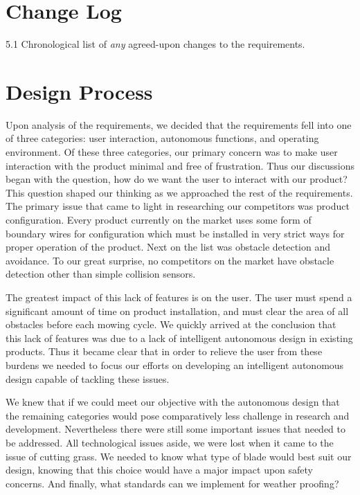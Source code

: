 \documentclass[11pt,letterpaper]{article}
\begin{document}
\section{Change Log}

5.1 Chronological list of \textit{any} agreed-upon changes to the requirements.

\section{Design Process}

Upon analysis of the requirements, we decided that the requirements fell into
one of three categories:  user interaction, autonomous functions, and operating
environment.  Of these three categories, our primary concern was to make user
interaction with the product minimal and free of frustration.  Thus our
discussions began with the question, how do we want the user to interact with
our product?  This question shaped our thinking as we approached the rest of the
requirements.  The primary issue that came to light in researching our
competitors was product configuration.  Every product currently on the market
uses some form of boundary wires for configuration which must be installed in
very strict ways for proper operation of the product.  Next on the list was
obstacle detection and avoidance.  To our great surprise, no competitors on the
market have obstacle detection other than simple collision sensors.

The greatest impact of this lack of features is on the user.  The user must
spend a significant amount of time on product installation, and must clear the
area of all obstacles before each mowing cycle.  We quickly arrived at the
conclusion that this lack of features was due to a lack of intelligent
autonomous design in existing products.  Thus it became clear that in order to
relieve the user from these burdens we needed to focus our efforts on developing
 an intelligent autonomous design capable of tackling these issues.

We knew that if we could meet our objective with the autonomous design that the
remaining categories would pose comparatively less challenge in research and
development.  Nevertheless there were still some important issues that needed to
be addressed. All technological issues aside, we were lost when it came to the
issue of cutting grass.  We needed to know what type of blade would best suit
our design, knowing that this choice would have a major impact upon safety
concerns.  And finally, what standards can we implement for weather proofing?
\end{document}
